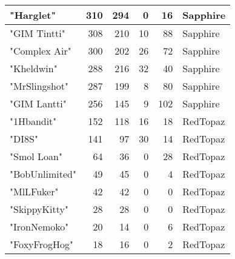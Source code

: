 \documentclass{article}
\begin{document}
\begin{table}[htbp]
\begin{tabular}{|l|r|r|r|r|l|}
"Harglet" & 310 & 294 & 0 & 16 & Sapphire \\ \hline
"GIM Tintti" & 308 & 210 & 10 & 88 & Sapphire \\ \hline
"Complex Air" & 300 & 202 & 26 & 72 & Sapphire \\ \hline
"Kheldwin" & 288 & 216 & 32 & 40 & Sapphire \\ \hline
"MrSlingshot" & 287 & 199 & 8 & 80 & Sapphire \\ \hline
"GIM Lantti" & 256 & 145 & 9 & 102 & Sapphire \\ \hline
"1Hbandit" & 152 & 118 & 16 & 18 & RedTopaz \\ \hline
"DI8S" & 141 & 97 & 30 & 14 & RedTopaz \\ \hline
"Smol Loan" & 64 & 36 & 0 & 28 & RedTopaz \\ \hline
"BobUnlimited" & 49 & 45 & 0 & 4 & RedTopaz \\ \hline
"MlLFuker" & 42 & 42 & 0 & 0 & RedTopaz \\ \hline
"SkippyKitty" & 28 & 28 & 0 & 0 & RedTopaz \\ \hline
"IronNemoko" & 20 & 14 & 0 & 6 & RedTopaz \\ \hline
"FoxyFrogHog" & 18 & 16 & 0 & 2 & RedTopaz \\ \hline
\end{tabular}
\end{table}
\end{document}
